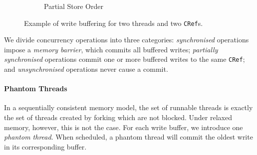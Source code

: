 \begin{figure}
\begin{subfigure}{0.3\textwidth}
    \caption{Partial Store Order}
  \end{subfigure}
  \caption{Example of write buffering for two threads and two \texttt{CRef}s.}
  \label{fig:wb}
\end{figure}

We divide concurrency operations into three categories: \emph{synchronised}
operations impose a \emph{memory barrier}, which commits all buffered writes;
\emph{partially synchronised} operations commit one or more buffered writes to
the same \verb|CRef|; and \emph{unsynchronised} operations never cause a commit.

\paragraph{Phantom Threads}
In a sequentially consistent memory model, the set of runnable threads is
exactly the set of threads created by forking which are not blocked.  Under
relaxed memory, however, this is not the case.  For each write buffer, we
introduce one \emph{phantom thread}.  When scheduled, a phantom thread will
commit the oldest write in its corresponding buffer.

